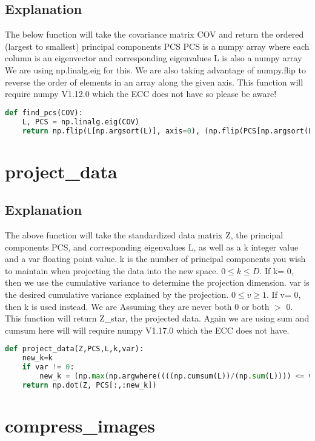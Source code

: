 \documentclass{article}
\begin{document}
\subsection{Explanation}
The below function will take the covariance matrix COV and return the ordered (largest to smallest) principal components PCS 
PCS is a numpy array where each column is an eigenvector and corresponding eigenvalues L is also a numpy array
We are using np.linalg.eig for this. We are also taking advantage of numpy.flip to reverse the order of elements in an array along the given axis. This function will require numpy V1.12.0 which the ECC does not have so please be aware!

\begin{lstlisting}[language=Python]
def find_pcs(COV):
	L, PCS = np.linalg.eig(COV)
	return np.flip(L[np.argsort(L)], axis=0), (np.flip(PCS[np.argsort(L)], axis=0)).transpose()
\end{lstlisting}

\section{project\_data}
\subsection{Explanation}
The above function will take the standardized data matrix Z, the principal components PCS, and corresponding eigenvalues L, 
as well as a k integer value and a var ﬂoating point value. k is the number of principal components you wish to maintain 
when projecting the data into the new space. $0 \leq  k \leq  D$. If k= 0, then we use the cumulative variance to determine the projection dimension. 
var is the desired cumulative variance explained by the projection. $0 \leq  v \geq  1$. 
If v= 0, then k is used instead. We are Assuming they are never both 0 or both $>$ 0. This function will return Z\_star, the projected data. Again we are using sum and cumsum here will will require numpy V1.17.0 which the ECC does not have.

\begin{lstlisting}[language=Python]
def project_data(Z,PCS,L,k,var):
	new_k=k
	if var != 0:
		new_k = (np.max(np.argwhere((((np.cumsum(L))/(np.sum(L)))) <= var)))
	return np.dot(Z, PCS[:,:new_k])
\end{lstlisting}

\section{compress\_images}
\end{document}
